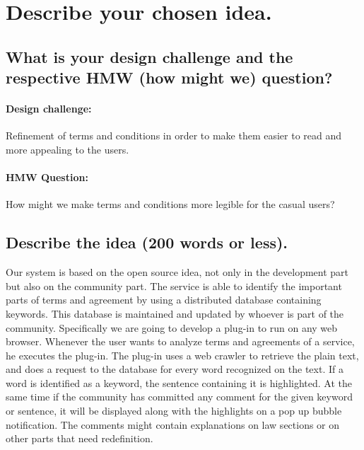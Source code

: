 \section{Describe your chosen idea.}
\label{s_3}

\subsection{What is your design challenge and the respective HMW (how might we) 
question?}
\paragraph{Design challenge:} Refinement of terms and conditions in order to 
make them easier to read and more appealing to the users.
\paragraph{HMW Question:} How might we make terms and conditions more legible 
for the casual users?

\subsection{Describe the idea (200 words or less).}
Our system is based on the  open source idea, not only in the development part 
but also on the community part. The service is able to identify the important 
parts of terms and agreement by using a distributed database containing keywords.
This database is maintained and updated by whoever is part of the community. 
Specifically we are going to develop a plug-in to run on any web browser.
Whenever the user wants to analyze terms and agreements of a service, he 
executes the plug-in. The plug-in uses a web crawler to retrieve the plain text, 
and does a request to the database for every word recognized on the text. If a 
word is identified as a keyword, the sentence containing it is highlighted. At 
the same time if the community has committed any comment for the given keyword 
or sentence, it will be displayed along with the highlights on a pop up bubble 
notification.
The comments might contain explanations on law sections or on other parts that 
need redefinition.

